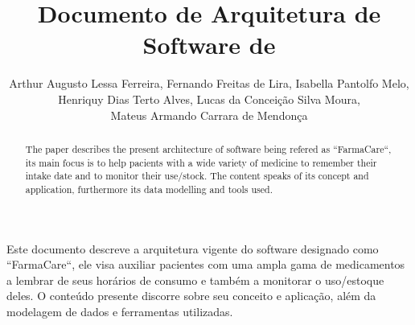 \documentclass[
	article,			%
	12pt,				%
	oneside,			%
	a4paper,			%
    BIBLATEX,           %
	english,			%
	brazil,				%
	sumario=tradicional
	]{abntex2}
\title{Documento de Arquitetura de Software de \nomeprojeto}
\author{Arthur Augusto Lessa Ferreira\inst{1}, Fernando Freitas de Lira\inst{1}, Isabella Pantolfo Melo\inst{1},\\ Henriquy Dias Terto Alves\inst{1}, Lucas da Conceição Silva Moura\inst{1},\\ Mateus Armando Carrara de Mendonça\inst{1} }
\newcommand\nomeprojeto{FarmaCare}
\begin{document}


\frenchspacing 


%
%

\maketitle


\begin{abstract}
  The paper describes the present architecture of software being refered as
  ``\nomeprojeto``, its main focus is to help pacients with a wide variety of
  medicine to remember their intake date and to monitor their use/stock.
  The content speaks of its concept and application, furthermore its
  data modelling and tools used.
\end{abstract}
     
\begin{resumo1} 
  Este documento descreve a arquitetura vigente do software designado como
  ``\nomeprojeto``, ele visa auxiliar pacientes com uma ampla gama de medicamentos
  a lembrar de seus horários de consumo e também a monitorar o uso/estoque deles.
  O conteúdo presente discorre sobre seu conceito e aplicação, além da
  modelagem de dados e ferramentas utilizadas.
\end{resumo1}






\textual
\end{document}
